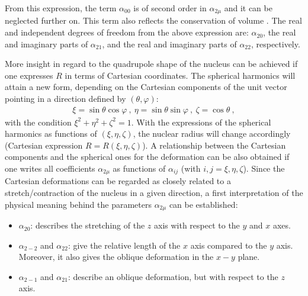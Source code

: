 From this expression, the term $\alpha_{00}$ is of second order in $\alpha_{2\mu}$ and it can be neglected further on. This term also reflects the conservation of volume \cite{greiner1996nuclear,ring2004nuclear}. The real and independent degrees of freedom from the above expression are: $\alpha_{20}$, the real and imaginary parts of $\alpha_{21}$, and the real and imaginary parts of $\alpha_{22}$, respectively.

More insight in regard to the quadrupole shape of the nucleus can be achieved if one expresses $R$ in terms of Cartesian coordinates. The spherical harmonics will attain a new form, depending on the Cartesian components of the unit vector pointing in a direction defined by $(\theta,\varphi)$:
\begin{align}
    \xi=\sin\theta\cos\varphi\ ,\ \eta=\sin\theta\sin\varphi\ ,\ \zeta=\cos\theta\ ,
\end{align}
with the condition $\xi^2+\eta^2+\zeta^2=1$. With the expressions of the spherical harmonics as functions of $(\xi,\eta,\zeta)$, the nuclear radius will change accordingly (Cartesian expression $R=R(\xi,\eta,\zeta)$). A relationship between the Cartesian components and the spherical ones for the deformation can be also obtained if one writes all coefficients $\alpha_{2\mu}$ as functions of $\alpha_{ij}$ (with $i,j=\xi,\eta,\zeta$). Since the Cartesian deformations can be regarded as closely related to a stretch/contraction of the nucleus in a given direction, a first interpretation of the physical meaning behind the parameters $\alpha_{2\mu}$ can be established:
\begin{itemize}
    \item $\alpha_{20}$: describes the stretching of the $z$ axis with respect to the $y$ and $x$ axes.
    \item $\alpha_{2-2}$ and $\alpha_{22}$: give the relative length of the $x$ axis compared to the $y$ axis. Moreover, it also gives the oblique deformation in the $x-y$ plane.
    \item $\alpha_{2-1}$ and $\alpha_{21}$: describe an oblique deformation, but with respect to the $z$ axis.
\end{itemize}

